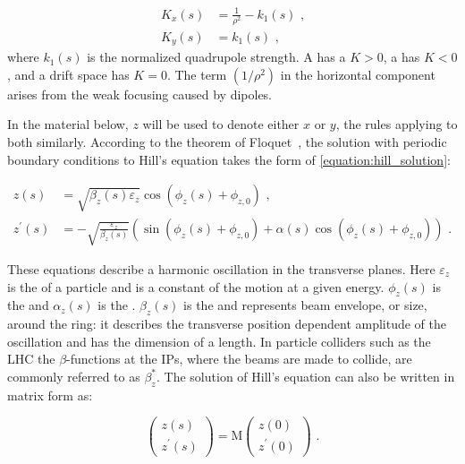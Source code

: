\begin{equation}
	\begin{aligned}
		K_x(s) &= \frac{1}{\rho^2} - k_1(s) \text{ ,} \\
    	K_y(s) &= k_1(s) \text{ ,}
	\end{aligned}
    \label{equation:transverse_focusing_strengths}
\end{equation}
where \(k_1(s)\) is the normalized quadrupole strength.
A  has a \(K > 0\), a  has \(K < 0\), and a drift space has \(K = 0\).
The term \(\left(1 / \rho^2\right)\) in the horizontal component arises from the weak focusing caused by dipoles.

In the material below, \(z\) will be used to denote either \(x\) or \(y\), the rules applying to both similarly.
According to the theorem of Floquet~\cite{BOOK:Lee:Accelerator_physics}, the solution with periodic boundary conditions to Hill’s equation takes the form of \cref{equation:hill_solution}:

\begin{equation}
    \begin{aligned}
        z(s)          &= \sqrt{\beta_{z}(s) \varepsilon_{z}} \cos \left( \phi_{z}(s) + \phi_{z,0} \right) \text{ ,} \\
        z^{\prime}(s) &= -\sqrt{\frac{\varepsilon_z}{\beta_z(s)}} \left( \sin \left(\phi_z(s) + \phi_{z, 0} \right) + \alpha(s) \cos \left( \phi_z(s) + \phi_{z, 0} \right) \right) \text{ .}
    \end{aligned}
    \label{equation:hill_solution}
\end{equation}

These equations describe a harmonic oscillation in the transverse planes.
Here \(\varepsilon_z\) is the  of a particle and is a constant of the motion at a given energy. 
\(\phi_z(s)\) is the  and \(\alpha_z(s)\) is the .
\(\beta_z(s)\) is the  and represents beam envelope, or size, around the ring: it describes the transverse position dependent amplitude of the oscillation and has the dimension of a length.
In particle colliders such as the \gls{LHC} the \(\beta\)-functions at the \glspl{IP}, where the beams are made to collide, are commonly referred to as \(\beta_z^{\ast}\).
The solution of Hill's equation can also be written in matrix form as:

\begin{equation}
    \left(
        \begin{array}{c}
            z(s) \\
            z^{\prime}(s)
        \end{array} \right) = \mathrm{M} \left( 
        \begin{array}{c}
            z(0) \\
            z^{\prime}(0)
    \end{array} \right) \text{ .}
    \label{equation:hill_solution_matrix}
\end{equation}

